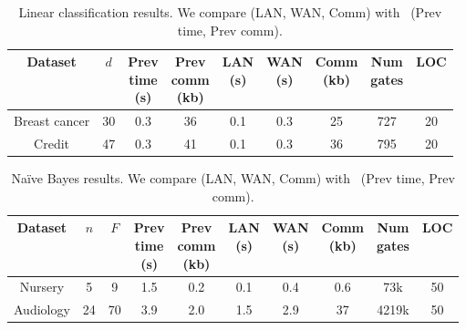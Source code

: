 \setlength\tabcolsep{2.8pt}
\begin{table}
\footnotesize
\begin{tabular}{|c|c|c|c|c|c|c|c|c|}
\hline
Dataset & $d$  & \thead{Prev \\ time\\ (s)} & \thead{Prev \\ comm\\ (kb)} & \thead{LAN  \\ (s)} & \thead{WAN\\ (s)} & \thead{Comm \\(kb)}  &  \thead{Num \\ gates} & LOC\\
\hline
Breast cancer & 30 & 0.3 & 36 & 0.1 & 0.3 & 25  & 727 & 20\\
\hline
Credit & 47 & 0.3 & 41 & 0.1 & 0.3 & 36  & 795 & 20\\
\hline
\end{tabular}
 \caption{Linear classification results. We compare \tool (LAN, WAN, Comm)
 with~\cite{shafindss} (Prev time, Prev comm).}
 \label{tab:lc} 
\end{table}



\setlength\tabcolsep{2.5pt}
\begin{table}
\footnotesize
\begin{tabular}{|c|c|c|c|c|c |c|c|c|c|}
\hline
Dataset & $n$ & $F$ & \thead{Prev \\ time\\ (s)} & \thead{Prev \\ comm\\ (kb)} & \thead{LAN  \\ (s)} & \thead{WAN\\ (s)} & \thead{Comm \\(kb)} & \thead{Num \\ gates}  & LOC\\
\hline
Nursery & 5 & 9 & 1.5 & 0.2 & 0.1 & 0.4 & 0.6  & 73k & 50\\
\hline
Audiology & 24 & 70 & 3.9 & 2.0 & 1.5 & 2.9 & 37  & 4219k & 50\\
\hline
\end{tabular}
\caption{Na\"{i}ve Bayes results. We compare \tool (LAN, WAN, Comm)
 with~\cite{shafindss} (Prev time, Prev comm).}
 \label{tab:nb} 
\end{table}


